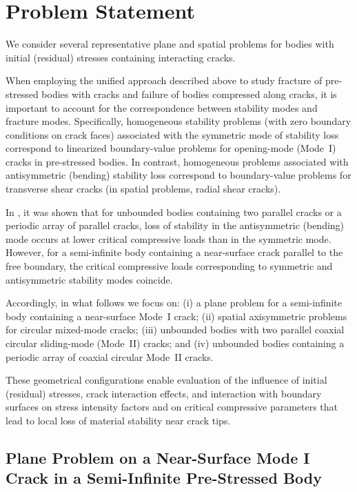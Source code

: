 \section{Problem Statement}
\label{BogdanovGuzSec3}

We consider several representative plane and spatial problems for bodies with initial (residual) stresses containing interacting cracks. 

When employing the unified approach described above to study fracture of pre-stressed bodies with cracks and failure of bodies compressed along cracks, it is important to account for the correspondence between stability modes and fracture modes. Specifically, homogeneous stability problems (with zero boundary conditions on crack faces) associated with the symmetric mode of stability loss correspond to linearized boundary-value problems for opening-mode (Mode~I) cracks in pre-stressed bodies. In contrast, homogeneous problems associated with antisymmetric (bending) stability loss correspond to boundary-value problems for transverse shear cracks (in spatial problems, radial shear cracks).

In \cite{BogdanovGuz31,BogdanovGuz32}, it was shown that for unbounded bodies containing two parallel cracks or a periodic array of parallel cracks, loss of stability in the antisymmetric (bending) mode occurs at lower critical compressive loads than in the symmetric mode. However, for a semi-infinite body containing a near-surface crack parallel to the free boundary, the critical compressive loads corresponding to symmetric and antisymmetric stability modes coincide.

Accordingly, in what follows we focus on:
(i) a plane problem for a semi-infinite body containing a near-surface Mode~I crack;
(ii) spatial axisymmetric problems for circular mixed-mode cracks;
(iii) unbounded bodies with two parallel coaxial circular sliding-mode (Mode~II) cracks; and
(iv) unbounded bodies containing a periodic array of coaxial circular Mode~II cracks.

These geometrical configurations enable evaluation of the influence of initial (residual) stresses, crack interaction effects, and interaction with boundary surfaces on stress intensity factors and on critical compressive parameters that lead to local loss of material stability near crack tips.

\subsection{Plane Problem on a Near-Surface Mode I Crack in a Semi-Infinite Pre-Stressed Body}

